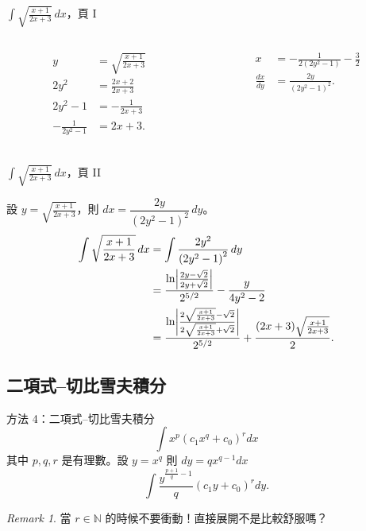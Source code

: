 \documentclass{beamer}
\newcommand{\Left} {\mathopen{}\mathclose\bgroup\left}
\newcommand{\Right}{\aftergroup\egroup\right}
\newcommand{\N}{\mathbb N}
\theoremstyle{remark}
\newtheorem{remark}{Remark}
\begin{document}
\begin{frame}{$\displaystyle \int \sqrt{\frac{x+1}{2x+3}}\,dx$，頁 I}
  \begin{columns}
    \begin{column}{0.5\textwidth}
      \begin{align*}
	y &= \sqrt{\frac{x+1}{2x+3}}\\
	2y^2 &= \frac{2x+2}{2x+3}\\
	2y^2 - 1 &= -\frac{1}{2x+3}\\
	-\frac{1}{2y^2 - 1} &= 2x+3.\\
      \end{align*}
    \end{column}
    \begin{column}{0.5\textwidth}
      \begin{align*}
	x &= -\frac{1}{2 \left( 2y^2 - 1 \right)} - \frac32\\
	\frac{dx}{dy} &= \frac{2y}{\left( 2y^2 - 1 \right)^2}.
      \end{align*}
    \end{column}
  \end{columns}
\end{frame}

\begin{frame}{$\displaystyle \int \sqrt{\frac{x+1}{2x+3}}\,dx$，頁 II}
  \begin{solution}
    設 $\displaystyle y = \sqrt{\frac{x+1}{2x+3}}$，則 $dx = \dfrac{2y}{\left( 2y^2 - 1 \right)^2}\,dy$。
    \begin{align*}
      \int \sqrt{\frac{x+1}{2x+3}}\,dx &= \int \frac{2y^2}{\left( 2y^2 - 1 \right)^2}\,dy  \qquad \\
	&= \frac{\ln \Left| \frac{2y - \sqrt2}{2y + \sqrt2} \Right|}{2^{5/2}} - \frac{y}{4y^2 - 2}\\
	&= \frac{\ln \Left| \frac{2\sqrt{\frac{x+1}{2x+3}} - \sqrt2}{2\sqrt{\frac{x+1}{2x+3}} + \sqrt2} \Right|}{2^{5/2}}
	  + \frac{(2x+3) \sqrt{\frac{x+1}{2x+3}}}{2}.
    \end{align*}
  \end{solution}
\end{frame}

\subsection[切比雪夫積分]{二項式--切比雪夫積分}
\begin{frame}{方法 4：二項式--切比雪夫積分}
  \[\int x^p \left( c_1 x^q + c_0 \right)^r dx\]
  其中 $p,q,r$ 是有理數。設 $y = x^q$ 則 $dy = qx^{q-1} dx$
  \[\int \frac{y^{\frac{p+1}{q}-1}}{q} \left( c_1 y + c_0 \right)^r dy.\]
  \begin{remark}
    當 $r \in \N$ 的時候不要衝動！直接展開不是比較舒服嗎？
  \end{remark}
\end{frame}
\end{document}
